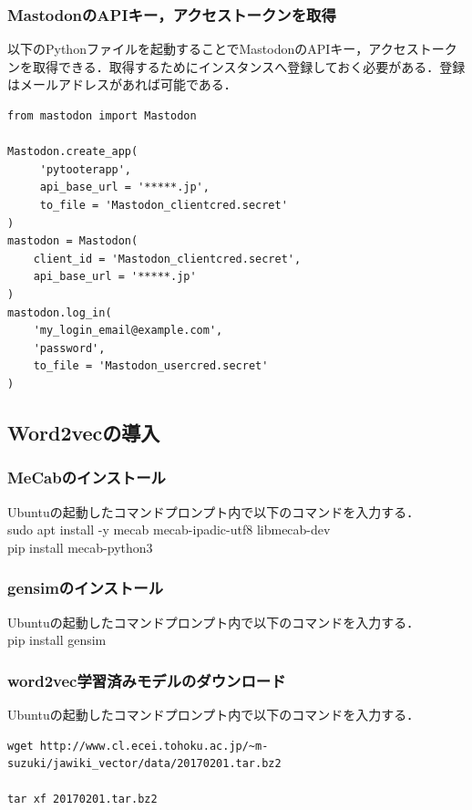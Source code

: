 \subsubsection{MastodonのAPIキー，アクセストークンを取得}
以下のPythonファイルを起動することでMastodonのAPIキー，アクセストークンを取得できる．取得するためにインスタンスへ登録しておく必要がある．登録はメールアドレスがあれば可能である．
\begin{lstlisting}[breaklines = true, basicstyle=\ttfamily\footnotesize, frame=single]
from mastodon import Mastodon

Mastodon.create_app(
     'pytooterapp',
     api_base_url = '*****.jp', 
     to_file = 'Mastodon_clientcred.secret' 
)
mastodon = Mastodon(
    client_id = 'Mastodon_clientcred.secret',
    api_base_url = '*****.jp'
)
mastodon.log_in(
    'my_login_email@example.com', 
    'password', 
    to_file = 'Mastodon_usercred.secret' 
)
\end{lstlisting}
\newpage

\subsection{Word2vecの導入}
\subsubsection{MeCabのインストール}
Ubuntuの起動したコマンドプロンプト内で以下のコマンドを入力する．\\

sudo apt install -y mecab mecab-ipadic-utf8 libmecab-dev\\

pip install mecab-python3\\

\subsubsection{gensimのインストール}
Ubuntuの起動したコマンドプロンプト内で以下のコマンドを入力する．\\

pip install gensim\\

\subsubsection{word2vec学習済みモデルのダウンロード}
Ubuntuの起動したコマンドプロンプト内で以下のコマンドを入力する．\\
\begin{verbatim}
wget http://www.cl.ecei.tohoku.ac.jp/~m-suzuki/jawiki_vector/data/20170201.tar.bz2

tar xf 20170201.tar.bz2
\end{verbatim}
\newpage
